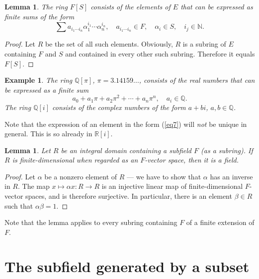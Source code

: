 \documentclass[a4paper,11pt,final,openany]{memoir}
\newtheorem{lemma}[X]{Lemma}
\newtheorem{example}[X]{Example}
\theoremstyle{nonumberplain}
\newtheorem{proof}{Proof.}
\begin{document}
\begin{lemma}
\label{ef13}The ring $F[S]$ consists of the elements of $E$ that can be
expressed as finite sums of the form
\begin{equation}
\sum a_{i_{1}\cdots i_{n}}\alpha_{1}^{i_{1}}\cdots\alpha_{n}^{i_{n}},\quad
a_{i_{1}\cdots i_{n}}\in F,\quad\alpha_{i}\in S,\quad i_{j}\in\mathbb{N}{}.
\label{eq7}%
\end{equation}

\end{lemma}

\begin{proof}
Let $R$ be the set of all such elements. Obviously, $R$ is a subring of $E$
containing $F$ and $S$ and contained in every other such subring. Therefore it
equals $F[S]$.
\end{proof}

\begin{example}
\label{ef15}The ring $\mathbb{Q}[\pi]$, $\pi=3.14159...$, consists of the real
numbers that can be expressed as a finite sum
\[
a_{0}+a_{1}\pi+a_{2}\pi^{2}+\cdots+a_{n}\pi^{n},\quad a_{i}\in\mathbb{Q}.
\]
The ring $\mathbb{Q}[i]$ consists of the complex numbers of the form $a+bi$,
$a,b\in\mathbb{Q}$.
\end{example}

Note that the expression of an element in the form (\ref{eq7}) will
\textit{not}\emph{\/} be unique in general. This is so already in
$\mathbb{R}{}[i]$.

\begin{lemma}
\label{ef14}Let $R$ be an integral domain containing a subfield $F$ (as a
subring). If $R$ is finite-dimensional when regarded as an $F$-vector space,
then it is a field.
\end{lemma}

\begin{proof}
Let $\alpha$ be a nonzero element of $R$ --- we have to show that $\alpha$ has
an inverse in $R$. The map $x\mapsto\alpha x\colon R\rightarrow R$ is an
injective linear map of finite-dimensional $F$-vector spaces, and is therefore
surjective. In particular, there is an element $\beta\in R$ such that
$\alpha\beta=1$.
\end{proof}

Note that the lemma applies to every subring containing $F$ of a finite
extension of $F$.

\section{The subfield generated by a subset}%
\end{document}

